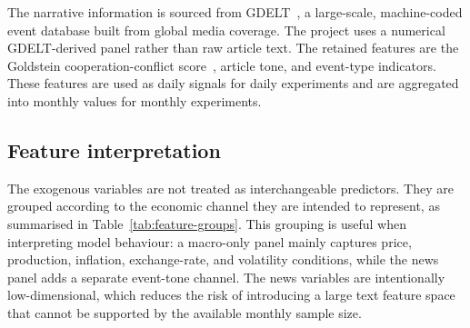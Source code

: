 \documentclass[11pt,a4paper]{article}
\begin{document}
The narrative information is sourced from GDELT~\citep{leetaru2013gdelt}, a large-scale, machine-coded event database built from global media coverage. The project uses a numerical GDELT-derived panel rather than raw article text. The retained features are the Goldstein cooperation-conflict score~\citep{goldstein1992conflict}, article tone, and event-type indicators. These features are used as daily signals for daily experiments and are aggregated into monthly values for monthly experiments.

\subsection{Feature interpretation}

The exogenous variables are not treated as interchangeable predictors. They are grouped according to the economic channel they are intended to represent, as summarised in Table~\ref{tab:feature-groups}. This grouping is useful when interpreting model behaviour: a macro-only panel mainly captures price, production, inflation, exchange-rate, and volatility conditions, while the news panel adds a separate event-tone channel. The news variables are intentionally low-dimensional, which reduces the risk of introducing a large text feature space that cannot be supported by the available monthly sample size.

\begin{table}[h!]
\centering
\caption{Interpretive grouping of the exogenous features.}\label{tab:feature-groups}
\small
{}
\end{table}
\end{document}
